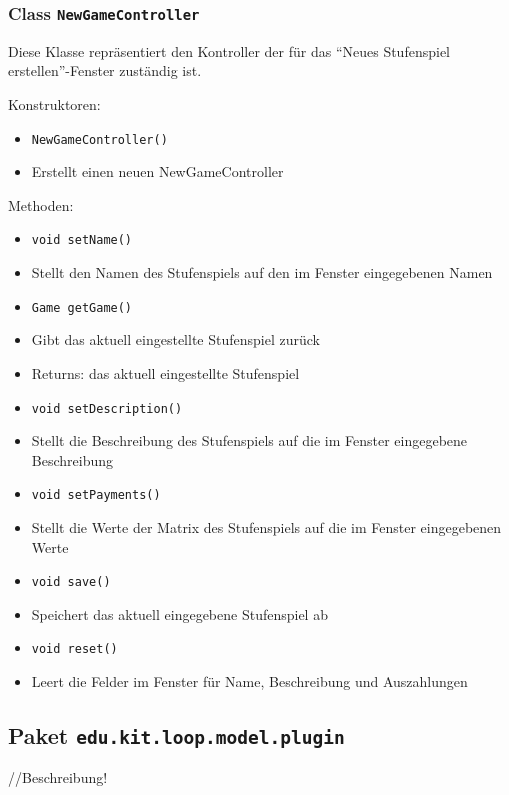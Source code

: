 \documentclass[parskip=full,11pt]{scrartcl}
\begin{document}
\subsubsection{Class \texttt{NewGameController}}
Diese Klasse repräsentiert den Kontroller der für das \enquote{Neues Stufenspiel erstellen}-Fenster zuständig ist.

Konstruktoren:
\begin{itemize}\itemsep -10pt
\item \texttt{NewGameController()}
\item[] Erstellt einen neuen NewGameController
\end{itemize}

Methoden:
\begin{itemize}\itemsep -10pt
\item \texttt{void setName()}
\item[] Stellt den Namen des Stufenspiels auf den im Fenster eingegebenen Namen


\item \texttt{Game getGame()}
\item[] Gibt das aktuell eingestellte Stufenspiel zurück
\item[] Returns: das aktuell eingestellte Stufenspiel

\item \texttt{void setDescription()}
\item[] Stellt die Beschreibung des Stufenspiels auf die im Fenster eingegebene Beschreibung

\item \texttt{void setPayments()}
\item[] Stellt die Werte der Matrix des Stufenspiels auf die im Fenster eingegebenen Werte

\item\texttt{void save()}
\item[] Speichert das aktuell eingegebene Stufenspiel ab

\item \texttt{void reset()}
\item[] Leert die Felder im Fenster für Name, Beschreibung und Auszahlungen

\end{itemize}

\subsection{Paket \texttt{edu.kit.loop.model.plugin}}
//Beschreibung!
\end{document}
